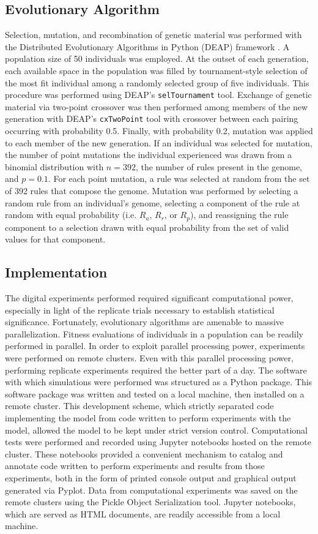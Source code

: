 \subsection{Evolutionary Algorithm} \label{sec:ea}
Selection, mutation, and recombination of genetic material was performed with the Distributed Evolutionary Algorithms in Python (DEAP) framework \cite{Fortin2012DEAP:Easy}.
A population size of 50 individuals was employed.
At the outset of each generation, each available space in the population was filled by tournament-style selection of the most fit individual among a randomly selected group of five individuals.
This procedure was performed using DEAP's \texttt{selTournament} tool.
Exchange of genetic material via two-point crossover was then performed among members of the new generation with DEAP's \texttt{cxTwoPoint} tool with crossover between each pairing occurring with probability 0.5.
Finally, with probability 0.2, mutation was applied to each member of the new generation.
If an individual was selected for mutation, the number of point mutations the individual experienced was drawn from a binomial distribution with $n=392$, the number of rules present in the genome, and $p=0.1$.
For each point mutation, a rule was selected at random from the set of 392 rules that compose the genome.
Mutation was performed by selecting a random rule from an individual's genome, selecting a component of the rule at random with equal probability (i.e. $R_a$, $R_r$, or $R_p$), and reassigning the rule component to a selection drawn with equal probability from the set of valid values for that component.

\subsection{Implementation} \label{sec:implementation}
The digital experiments performed required significant computational power, especially in light of the replicate trials necessary to establish statistical significance.
Fortunately, evolutionary algorithms are amenable to massive parallelization.
Fitness evaluations of individuals in a population can be readily performed in parallel.
In order to exploit parallel processing power, experiments were performed on remote clusters.
Even with this parallel processing power, performing replicate experiments required the better part of a day. 
The software with which simulations were performed was structured as a Python package.
This software package was written and tested on a local machine, then installed on a remote cluster.
This development scheme, which strictly separated code implementing the model from code written to perform experiments with the model, allowed the model to be kept under strict version control.
Computational tests were performed and recorded using Jupyter notebooks hosted on the remote cluster.
These notebooks provided a convenient mechanism to catalog and annotate code written to perform experiments and results from those experiments, both in the form of printed console output and graphical output generated via Pyplot.
Data from computational experiments was saved on the remote clusters using the Pickle Object Serialization tool.
Jupyter notebooks, which are served as HTML documents, are readily accessible from a local machine.

